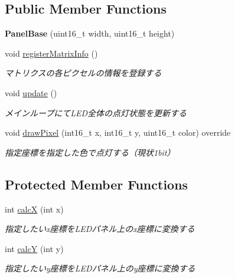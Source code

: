 \subsection*{Public Member Functions}
\begin{DoxyCompactItemize}
\item 
\mbox{\label{classPanelBase_a0f76bbbbc0085b494cd9ed3ab8e61a42}} 
{\bfseries Panel\+Base} (uint16\+\_\+t width, uint16\+\_\+t height)
\item 
\mbox{\label{classPanelBase_a9542aee20715ce1392aa7468f6c51ad8}} 
void \hyperlink{classPanelBase_a9542aee20715ce1392aa7468f6c51ad8}{register\+Matrix\+Info} ()
\begin{DoxyCompactList}\small\item\em マトリクスの各ピクセルの情報を登録する \end{DoxyCompactList}\item 
\mbox{\label{classPanelBase_aece79bece96754da41945381d63a08fb}} 
void \hyperlink{classPanelBase_aece79bece96754da41945381d63a08fb}{update} ()
\begin{DoxyCompactList}\small\item\em メインループにて\+L\+E\+D全体の点灯状態を更新する \end{DoxyCompactList}\item 
\mbox{\label{classPanelBase_a45f3a84f68861b3ae1bb34056bfd0d12}} 
void \hyperlink{classPanelBase_a45f3a84f68861b3ae1bb34056bfd0d12}{draw\+Pixel} (int16\+\_\+t x, int16\+\_\+t y, uint16\+\_\+t color) override
\begin{DoxyCompactList}\small\item\em 指定座標を指定した色で点灯する（現状1bit） \end{DoxyCompactList}\end{DoxyCompactItemize}
\subsection*{Protected Member Functions}
\begin{DoxyCompactItemize}
\item 
\mbox{\label{classPanelBase_a4f9d7f1571a34a91574f078e5be49826}} 
int \hyperlink{classPanelBase_a4f9d7f1571a34a91574f078e5be49826}{calcX} (int x)
\begin{DoxyCompactList}\small\item\em 指定したいx座標を\+L\+E\+Dパネル上のx座標に変換する \end{DoxyCompactList}\item 
\mbox{\label{classPanelBase_a0d128c31d63506c90d2d103a07ef5ac9}} 
int \hyperlink{classPanelBase_a0d128c31d63506c90d2d103a07ef5ac9}{calcY} (int y)
\begin{DoxyCompactList}\small\item\em 指定したいy座標を\+L\+E\+Dパネル上のy座標に変換する \end{DoxyCompactList}\end{DoxyCompactItemize}
